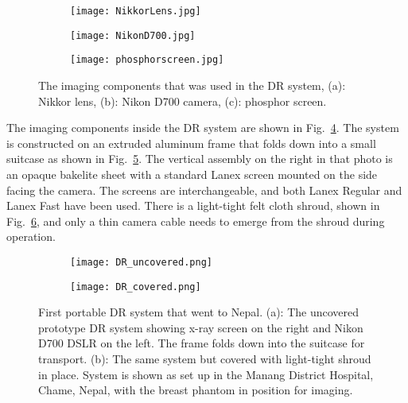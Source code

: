 \begin{figure}[h]
	\begin{subfigure}[b]{0.3\linewidth}
		\centering
		\texttt{[image: NikkorLens.jpg]}
		\caption{}
		\label{fig:nikonlens}
	\end{subfigure}
	\hspace{0.2cm}
	\begin{subfigure}[b]{0.3\linewidth}
		\centering
		\texttt{[image: NikonD700.jpg]}
		\caption{}
		\label{fig:nikoncamera}
	\end{subfigure}
	\hspace{0.2cm}
	\begin{subfigure}[b]{0.3\linewidth}
		\texttt{[image: phosphorscreen.jpg]}
		\caption{}
		\label{fig:phosphorscreen}
	\end{subfigure}
\caption{The imaging components that was used in the DR system, (a): Nikkor lens, (b): Nikon D700 camera, (c): phosphor screen.}
\label{fig:DRcomponents}
\end{figure}

The imaging components inside the DR system are shown in Fig.~\ref{fig:DRcomponents}.  The system is constructed on an extruded aluminum frame that folds down into a small suitcase as shown in Fig.~\ref{fig:DR1uncovered}. The vertical assembly on the right in that photo is an opaque bakelite sheet with a standard Lanex screen mounted on the side facing the camera. The screens are interchangeable, and both Lanex Regular and Lanex Fast have been used. There is a light-tight felt cloth shroud, shown in Fig.~\ref{fig:DR1covered}, and only a thin camera cable needs to emerge from the shroud during operation.

\begin{figure}[h]
\centering
	\begin{subfigure}[b]{0.45\linewidth}
	\texttt{[image: DR\_uncovered.png]}
	\caption{}
	\label{fig:DR1uncovered}
	\end{subfigure}
\hspace{0.2cm}
	\begin{subfigure}[b]{0.45\linewidth}
	\centering
	\texttt{[image: DR\_covered.png]}
	\caption{}
	\label{fig:DR1covered}
	\end{subfigure}
\caption{First portable DR system that went to Nepal.  (a): The uncovered prototype DR system showing x-ray screen on the right and Nikon D700 DSLR on the left.  The frame folds down into the suitcase for transport.  (b): The same system but covered with light-tight shroud in place.  System is shown as set up in the Manang District Hospital, Chame, Nepal, with the breast phantom in position for imaging.}
\label{fig:DR1}
\end{figure}

